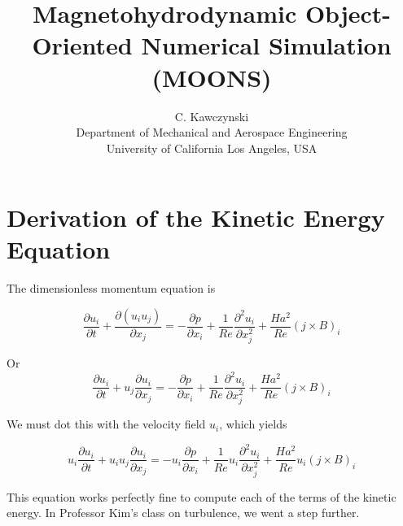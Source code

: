 \documentclass[11pt]{article}
\begin{document}
\doublespacing
\title{Magnetohydrodynamic Object-Oriented Numerical Simulation (MOONS)}
\author{C. Kawczynski \\
Department of Mechanical and Aerospace Engineering \\
University of California Los Angeles, USA\\
}
\maketitle

\section{Derivation of the Kinetic Energy Equation}
The dimensionless momentum equation is


\begin{equation}
	\frac{\partial u_i}{\partial t} + 
	\frac{\partial (u_i u_j)}{\partial x_j}
	= 
	- \frac{\partial p}{\partial x_i}
	+ \frac{1}{Re}
	\frac{\partial^2 u_i}{\partial x_j^2}
	+ \frac{Ha^2}{Re}
	(j \times B)_i
\end{equation}

Or
\begin{equation}
	\frac{\partial u_i}{\partial t} + 
	u_j\frac{\partial u_i}{\partial x_j}
	= 
	- \frac{\partial p}{\partial x_i}
	+ \frac{1}{Re}
	\frac{\partial^2 u_i}{\partial x_j^2}
	+ \frac{Ha^2}{Re}
	(j \times B)_i
\end{equation}


We must dot this with the velocity field $u_i$, which yields

\begin{equation}
	\boxed{
	u_i
	\frac{\partial u_i}{\partial t} + 
	u_i
	u_j\frac{\partial u_i}{\partial x_j}
	= 
	- u_i
	\frac{\partial p}{\partial x_i}
	+ \frac{1}{Re}
	u_i
	\frac{\partial^2 u_i}{\partial x_j^2}
	+ \frac{Ha^2}{Re}
	u_i
	(j \times B)_i
	}
\end{equation}

This equation works perfectly fine to compute each of the terms of the kinetic energy. In Professor Kim's class on turbulence, we went a step further.
\end{document}
